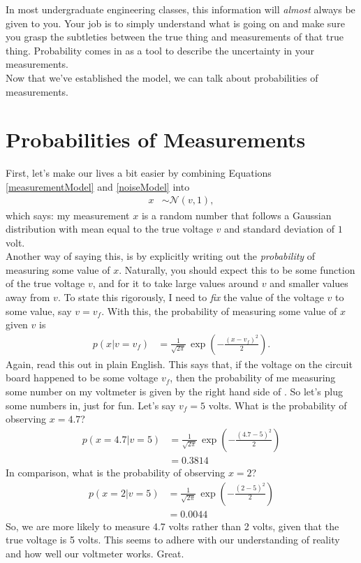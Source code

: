 \documentclass[10pt,letterpaper]{article}
\begin{document}
In most undergraduate engineering classes, this information will \emph{almost} always be given to you. Your job is to simply understand what is going on and make sure you grasp the subtleties between the true thing and measurements of that true thing. Probability comes in as a tool to describe the uncertainty in your measurements.\\

Now that we've established the model, we can talk about probabilities of measurements.

\section{Probabilities of Measurements}
First, let's make our lives a bit easier by combining Equations \eqref{measurementModel} and \eqref{noiseModel} into
\begin{align}
	x &\sim \mathcal{N}(v,1),
\end{align}
which says: my measurement $x$ is a random number that follows a Gaussian distribution with mean equal to the true voltage $v$ and standard deviation of $1$ volt.\\

Another way of saying this, is by explicitly writing out the \emph{probability} of measuring some value of $x$. Naturally, you should expect this to be some function of the true voltage $v$, and for it to take large values around $v$ and smaller values away from $v$. To state this rigorously, I need to \emph{fix} the value of the voltage $v$ to some value, say $v = v_f$. With this, the probability of measuring some value of $x$ given $v$ is
\begin{align}
	p(x \vert v=v_f) &= \frac{1}{\sqrt{2\pi}}\,\exp\left( -\frac{(x-v_f)^2}{2} \right) \label{prob}.
\end{align}
Again, read this out in plain English. This says that, if the voltage on the circuit board happened to be some voltage $v_f$, then the probability of me measuring some number on my voltmeter is given by the right hand side of . So let's plug some numbers in, just for fun. Let's say $v_f = 5$ volts. What is the probability of observing $x=4.7$?
\begin{align}
	p(x=4.7 \vert v = 5) &= \frac{1}{\sqrt{2\pi}}\,\exp\left(-\frac{(4.7-5)^2}{2} \right)\\
						 &= 0.3814
\end{align}
In comparison, what is the probability of observing $x=2$?
\begin{align}
	p(x=2 \vert v = 5) &= \frac{1}{\sqrt{2\pi}}\,\exp\left(-\frac{(2-5)^2}{2} \right)\\
						 &= 0.0044
\end{align}
So, we are more likely to measure 4.7 volts rather than 2 volts, given that the true voltage is 5 volts. This seems to adhere with our understanding of reality and how well our voltmeter works. Great.\\
\end{document}
